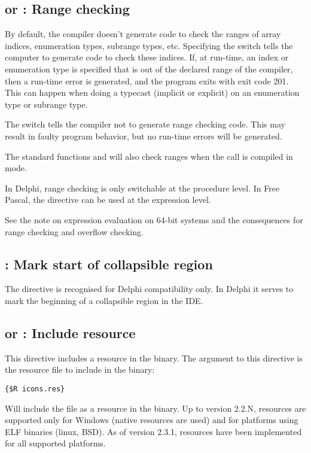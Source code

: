 \subsection{ or  : Range checking}

By default, the compiler doesn't generate code to check the ranges of array
indices, enumeration types, subrange types, etc. Specifying the
 switch tells the computer to generate code to check these
indices. If, at run-time, an index or enumeration type is specified that is
out of the declared range of the compiler, then a run-time error is
generated, and the program exits with exit code 201. This can happen when
doing a typecast (implicit or explicit) on an enumeration type or subrange
type.

The  switch tells the compiler not to generate range checking
code. This may result in faulty program behavior, but no run-time errors
will be generated.

\begin{remark}The standard functions  and  will also check ranges
when the call is compiled in  mode.
\end{remark}

In Delphi, range checking is only switchable at the procedure level. 
In Free Pascal, the  directive can be used at the expression level.

\begin{remark}
See the note on expression evaluation on 64-bit systems and the consequences
for range checking and overflow checking.
\end{remark}

\subsection{ : Mark start of collapsible region}
The  directive is recognised for Delphi compatibility only.
In Delphi it serves to mark the beginning of a collapsible region in the
IDE.

\subsection{ or  : Include resource}
This directive includes a resource in the binary. 
The argument to this directive is the resource file to include in the binary:
\begin{verbatim}
{$R icons.res}
\end{verbatim}
Will include the file  as a resource in the binary. Up to
version 2.2.N, resources are supported only for Windows (native resources are used) 
and for platforms using ELF binaries (linux, BSD). As of version 2.3.1,
resources have been implemented for all supported platforms.

